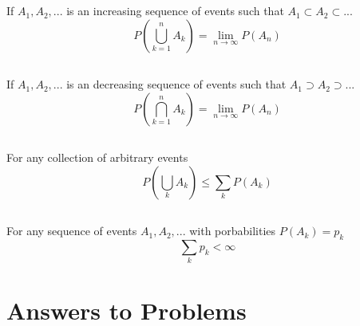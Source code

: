 \subsection{}
If $A_1, A_2, ...$ is an increasing sequence of events such that $A_1 \subset A_2 \subset ...$
\begin{equation}
	P\left(\bigcup_{k=1}^n A_k \right) = \lim_{n \rightarrow \infty} P(A_n)
\end{equation}

\subsection{}
If $A_1, A_2, ...$ is an decreasing sequence of events such that $A_1 \supset A_2 \supset ...$
\begin{equation}
	P\left(\bigcap_{k=1}^n A_k \right) = \lim_{n \rightarrow \infty} P(A_n)
\end{equation}


\subsection{}
For any collection of arbitrary events
\begin{equation}
	P\left(\bigcup_{k} A_k \right) \leq \sum_k P(A_k)
\end{equation}

\subsection{}
For any sequence of events $A_1, A_2, ...$ with porbabilities $P(A_k)=p_k$
\begin{equation}
	\sum_k p_k < \infty
\end{equation}

\section{Answers to Problems}

%
%
%	


\subsection{}
